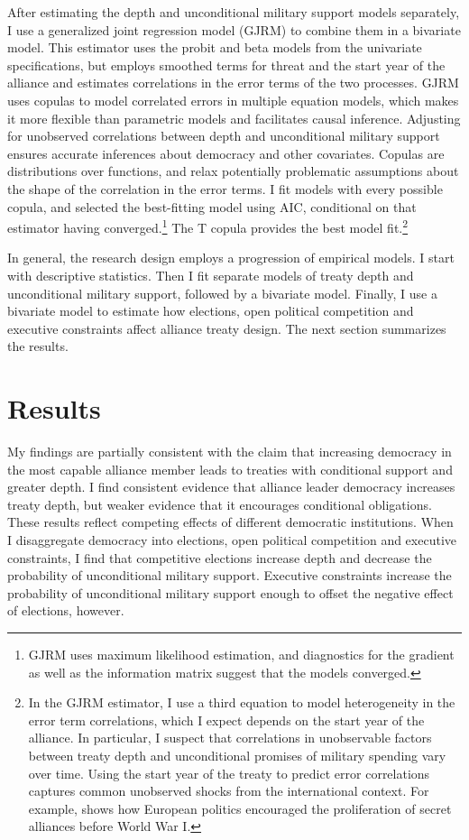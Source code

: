 \documentclass[12pt]{article}
\begin{document}
After estimating the depth and unconditional military support models separately, I use a generalized joint regression model (GJRM) \citep{Braumoelleretal2018} to combine them in a bivariate model.
This estimator uses the probit and beta models from the univariate specifications, but employs smoothed terms for threat and the start year of the alliance and estimates correlations in the error terms of the two processes. 
GJRM uses copulas to model correlated errors in multiple equation models, which makes it more flexible than parametric models and facilitates causal inference. 
Adjusting for unobserved correlations between depth and unconditional military support ensures accurate inferences about democracy and other covariates. 
Copulas are distributions over functions, and relax potentially problematic assumptions about the shape of the correlation in the error terms. 
I fit models with every possible copula, and selected the best-fitting model using AIC, conditional on that estimator having converged.\footnote{GJRM uses maximum likelihood estimation, and diagnostics for the gradient as well as the information matrix suggest that the models converged.} 
The T copula provides the best model fit.\footnote{In the GJRM estimator, I use a third equation to model heterogeneity in the error term correlations, which I expect depends on the start year of the alliance. 
In particular, I suspect that correlations in unobservable factors between treaty depth and unconditional promises of military spending vary over time. 
Using the start year of the treaty to predict error correlations captures common unobserved shocks from the international context. 
For example, \citet{Kuo2019} shows how European politics encouraged the proliferation of secret alliances before World War I.}


In general, the research design employs a progression of empirical models. 
I start with descriptive statistics. 
Then I fit separate models of treaty depth and unconditional military support, followed by a bivariate model. 
Finally, I use a bivariate model to estimate how elections, open political competition and executive constraints affect alliance treaty design. 
The next section summarizes the results. 


\section{Results}


My findings are partially consistent with the claim that increasing democracy in the most capable alliance member leads to treaties with conditional support and greater depth. 
I find consistent evidence that alliance leader democracy increases treaty depth, but weaker evidence that it encourages conditional obligations. 
These results reflect competing effects of different democratic institutions. 
When I disaggregate democracy into elections, open political competition and executive constraints, I find that competitive elections increase depth and decrease the probability of unconditional military support.
Executive constraints increase the probability of unconditional military support enough to offset the negative effect of elections, however. 
\end{document}
